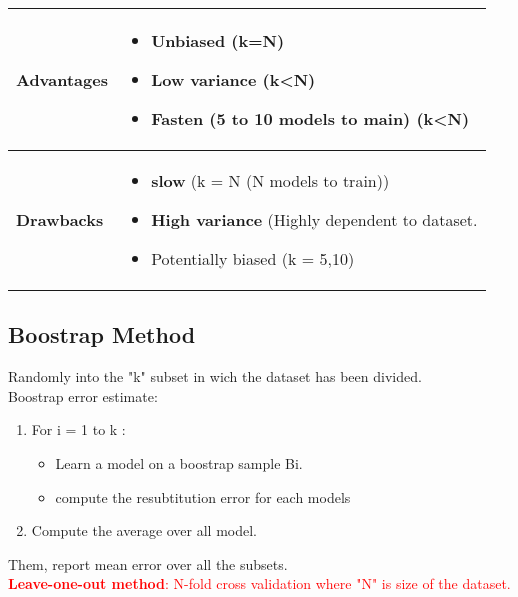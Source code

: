   \begin{table}[!h]
    \begin{center}
    \begin{tabular}{| m{8em}| m{15em}|}
    \hline
    \rowcolor{vert.g} \textbf{Advantages}     &  \begin{itemize}
                                                        \item \textbf{Unbiased} (k=N)
                                                        \item \textbf{Low variance} (k<N)
                                                        \item \textbf{Fasten} (5 to 10 models to main) (k<N)
                                                 \end{itemize}\\ \hline 
    \rowcolor{red.g} \textbf{Drawbacks}       &  \begin{itemize}
                                                        \item \textbf{slow} (k = N (N models to train))
                                                        \item \textbf{High variance} (Highly dependent to dataset.
                                                        \item Potentially biased (k = 5,10)
                                                  \end{itemize}\\ \hline
    \end{tabular}
    \end{center}
    \end{table}

    
\subsection{Boostrap Method}
Randomly into the "k" subset in wich the dataset has been divided.\\
Boostrap error estimate:
\begin{enumerate}
    \item For i = 1 to k : 
    \begin{itemize}
        \item Learn a model on a boostrap sample Bi.
        \item compute the resubtitution error for each models
    \end{itemize}
    \item Compute the average over all model.
\end{enumerate}
Them, report mean error over all the subsets.\\
\textcolor{red}{\textbf{Leave-one-out method}: N-fold cross validation where "N" is size of the dataset.}

